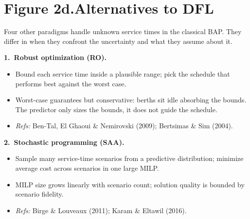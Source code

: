 \documentclass[11pt]{article}
\begin{document}

\newpage

\section*{Figure 2d.\quad Alternatives to DFL}

\noindent
Four other paradigms handle unknown service times in the classical
BAP. They differ in when they confront the uncertainty and what they
assume about it.

\vspace{0.5em}

\noindent\textbf{1.\ Robust optimization (RO).}
\begin{itemize}[leftmargin=2em, itemsep=0pt]
  \item Bound each service time inside a plausible range; pick the
        schedule that performs best against the worst case.
  \item Worst-case guarantees but conservative: berths sit idle
        absorbing the bounds. The predictor only sizes the bounds, it
        does not guide the schedule.
  \item \emph{Refs:} Ben-Tal, El Ghaoui \& Nemirovski (2009);
        Bertsimas \& Sim (2004).
\end{itemize}

\vspace{0.4em}

\noindent\textbf{2.\ Stochastic programming (SAA).}
\begin{itemize}[leftmargin=2em, itemsep=0pt]
  \item Sample many service-time scenarios from a predictive
        distribution; minimize average cost across scenarios in one
        large MILP.
  \item MILP size grows linearly with scenario count; solution quality
        is bounded by scenario fidelity.
  \item \emph{Refs:} Birge \& Louveaux (2011); Karam \& Eltawil (2016).
\end{itemize}
\end{document}
